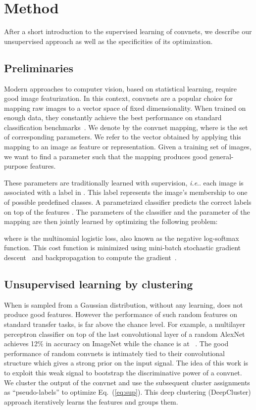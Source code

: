 \documentclass[runningheads]{llncs}
\makeatletter
\DeclareRobustCommand\onedot{\futurelet\@let@token\@onedot}
\def\@onedot{\ifx\@let@token.\else.\null\fi\xspace}
\def\ie{\emph{i.e}\onedot} \def\Ie{\emph{I.e}\onedot}
\makeatother
\begin{document}
 


\section{Method}

After a short introduction to the supervised learning of convnets, we describe our unsupervised approach as well as the specificities of its optimization.

\subsection{Preliminaries}
Modern approaches to computer vision, based on statistical learning, require good image featurization.
In this context, convnets are a popular choice for mapping raw images to a vector space of fixed dimensionality.
When trained on enough data, they constantly achieve the best performance on standard classification benchmarks~\cite{he2015delving,krizhevsky2012imagenet}.
We denote by  the convnet mapping, where  is the set of corresponding parameters.
We refer to the vector obtained by applying this mapping to an image as feature or representation.
Given a training set  of  images, we want to find a parameter  such that the mapping  produces good general-purpose features.

These parameters are traditionally learned with supervision, \ie each image  is associated with a label  in .
This label represents the image's membership to one of  possible predefined classes.
A parametrized classifier  predicts the correct labels on top of the features .
The parameters  of the classifier and the parameter  of the mapping are then jointly learned by optimizing the following problem:

where  is the multinomial logistic loss, also known as the negative log-softmax function.
This cost function is minimized using mini-batch stochastic gradient descent~\cite{bottou2012stochastic} and backpropagation to compute the gradient~\cite{lecun1998gradient}.


\subsection{Unsupervised learning by clustering}
When  is sampled from a Gaussian distribution, without any learning,  does not produce good features.
However the performance of such random features on standard transfer tasks, is far above the chance level.
For example, a multilayer perceptron classifier on top of the last convolutional layer of a random AlexNet achieves 12\% in accuracy on ImageNet while the chance is at ~\cite{noroozi2016unsupervised}.
The good performance of random convnets is intimately tied to their convolutional structure which gives a strong prior on the input signal.
The idea of this work is to exploit this weak signal to bootstrap the discriminative power of a convnet.
We cluster the output of the convnet and use the subsequent cluster assignments as ``pseudo-labels'' to optimize Eq.~(\ref{eq:sup}).
This deep clustering (DeepCluster) approach iteratively learns the features and groups them.
\end{document}
